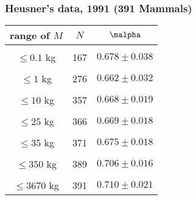 \begin{frame}
  \frametitle{Heusner's data, 1991 (391 Mammals)}

  \begin{center}
     \begin{tabular}{c|c|c}
       range of $M$ & $N$ & $\nalpha$ \\ \hline
       & & \\
       $\leq 0.1$ kg    &  167          & $0.678 \pm 0.038$ \\
       & & \\
       $\leq 1$  kg     &  276          & $0.662 \pm 0.032$ \\
       & & \\
       $\leq 10$ kg     &  357          & $0.668 \pm 0.019$ \\
       & & \\
       $\leq 25$ kg     &  366          & $0.669 \pm 0.018$ \\
       & & \\
       $\leq 35$ kg     &  371          & $0.675 \pm 0.018$ \\
       & & \\
       $\leq 350$ kg    &  389          & $0.706 \pm 0.016$ \\
       & & \\
       $\leq 3670$ kg   &  391          & $0.710 \pm 0.021$ \\
     \end{tabular}
  \end{center}





\end{frame}
